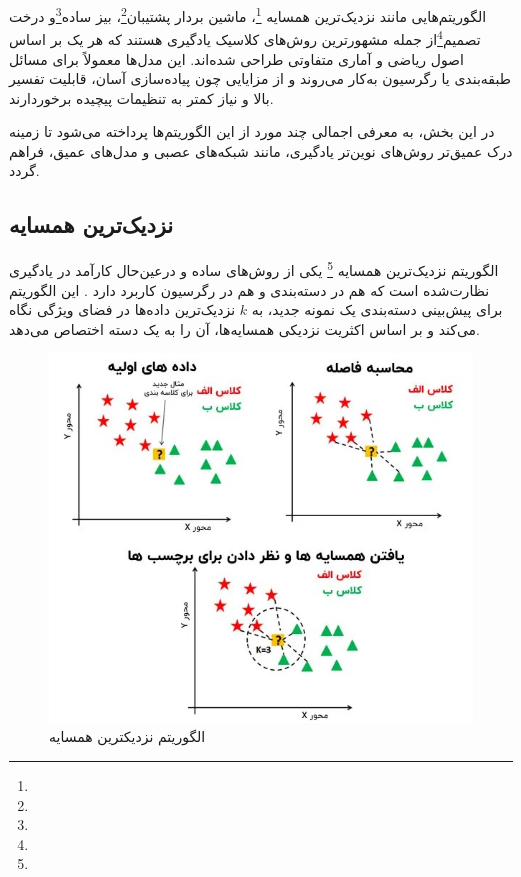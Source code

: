 الگوریتم‌هایی مانند نزدیک‌ترین همسایه \footnote{}، ماشین بردار پشتیبان\footnote{}، بیز ساده\footnote{}و درخت تصمیم\footnote{}از جمله مشهورترین روش‌های کلاسیک یادگیری هستند که هر یک بر اساس اصول ریاضی و آماری متفاوتی طراحی شده‌اند. این مدل‌ها معمولاً برای مسائل طبقه‌بندی یا رگرسیون به‌کار می‌روند و از مزایایی چون پیاده‌سازی آسان، قابلیت تفسیر بالا و نیاز کمتر به تنظیمات پیچیده برخوردارند.

در این بخش، به معرفی اجمالی چند مورد از این الگوریتم‌ها پرداخته می‌شود تا زمینه درک عمیق‌تر روش‌های نوین‌تر یادگیری، مانند شبکه‌های عصبی و مدل‌های عمیق، فراهم گردد.

\subsection{نزدیک‌ترین همسایه }

الگوریتم نزدیک‌ترین همسایه \footnote{} یکی از روش‌های ساده و درعین‌حال کارآمد در یادگیری نظارت‌شده است که هم در دسته‌بندی و هم در رگرسیون کاربرد دارد
\cite{cover1967nearest,duda1973pattern,mitchell1997machine}.
این الگوریتم برای پیش‌بینی دسته‌بندی یک نمونه جدید، به $k$ نزدیک‌ترین داده‌ها در فضای ویژگی نگاه می‌کند و بر اساس اکثریت نزدیکی همسایه‌ها، آن را به یک دسته اختصاص می‌دهد. 


\begin{figure}[h]
	\centering
	\begin{minipage}[b]{0.8\textwidth}
		\centering
		\includegraphics[width=\textwidth]{transformer_images/knn_11zon.jpg}
		\caption{الگوریتم نزدیکترین همسایه}
		\label{fig:k nearest neighbor}
	\end{minipage}
	\hfill
\end{figure}



